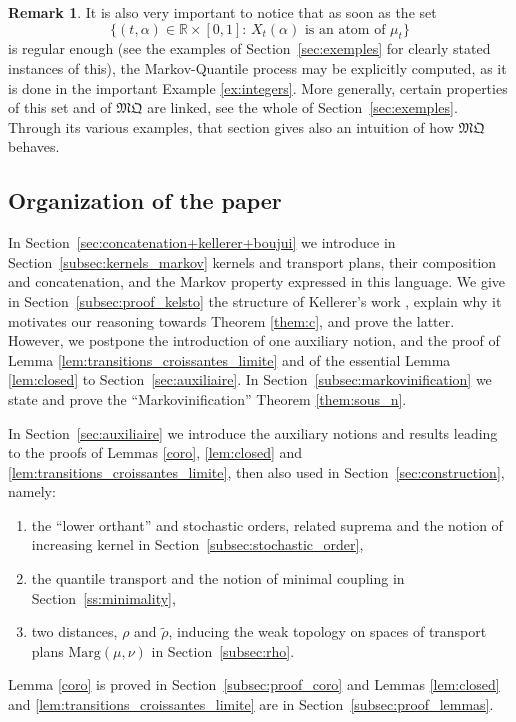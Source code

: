 \documentclass[JEP,XML,SOM,Unicode,NoEqCountersInSection,NoFloatCountersInSection,published]{cedram}
\theoremstyle{plain}
\theoremstyle{definition}
\newtheorem{rem}[them]{Remark}
\newcommand{\mq}{\mathfrak{MQ}}
\newcommand{\ma}{\mathrm{Marg}}
\newcommand{\R}{\mathbb{R}}
\begin{document}
\begin{rem}
It is also very important to notice that as soon as the set
\[
\{(t,\alpha)\in\R\times[0,1]:\,X_t(\alpha)\text{ is an atom of }\mu_t\}
\]
is regular enough (see the examples of Section~\ref{sec:exemples} for clearly stated instances of this), the Markov-Quantile process may be explicitly computed, as it is done in the important Example \ref{ex:integers}. More generally, certain properties of this set and of $\mq$ are linked, see the whole of Section~\ref{sec:exemples}. Through its various examples, that section gives also an intuition of how $\mq$ behaves.
\end{rem}

\subsection{Organization of the paper}\label{subsec:organisation}
In Section~\ref{sec:concatenation+kellerer+boujui} we introduce in Section~\ref{subsec:kernels_markov} kernels and transport plans, their composition and concatenation, and the Markov property expressed in this language. We give in Section~\ref{subsec:proof_kelsto} the structure of Kellerer's work \cite{Ke72,Ke73}, explain why it motivates our reasoning towards Theorem \ref{them:c}, and prove the latter. However, we postpone the introduction of one auxiliary notion, and the proof of Lemma \ref{lem:transitions_croissantes_limite} and of the essential Lemma \ref{lem:closed} to Section~\ref{sec:auxiliaire}. In Section~\ref{subsec:markovinification} we state and prove the ``Markovinification'' Theorem \ref{them:sous_n}.

In Section~\ref{sec:auxiliaire} we introduce the auxiliary notions and results leading to the proofs of Lemmas \ref{coro}, \ref{lem:closed} and \ref{lem:transitions_croissantes_limite}, then also used in Section~\ref{sec:construction}, namely:
\begin{enumerate}
\item the ``lower orthant'' and stochastic orders, related suprema and the notion of increasing kernel in Section~\ref{subsec:stochastic_order},
\item the quantile transport and the notion of minimal coupling in Section~\ref{ss:minimality},
\item two distances, $\rho$ and $\tilde \rho$, inducing the weak topology on spaces of transport plans $\ma(\mu,\nu)$ in Section~\ref{subsec:rho}.
\end{enumerate}
Lemma \ref{coro} is proved in Section~\ref{subsec:proof_coro} and Lemmas \ref{lem:closed} and \ref{lem:transitions_croissantes_limite} are in Section~\ref{subsec:proof_lemmas}.
\end{document}

